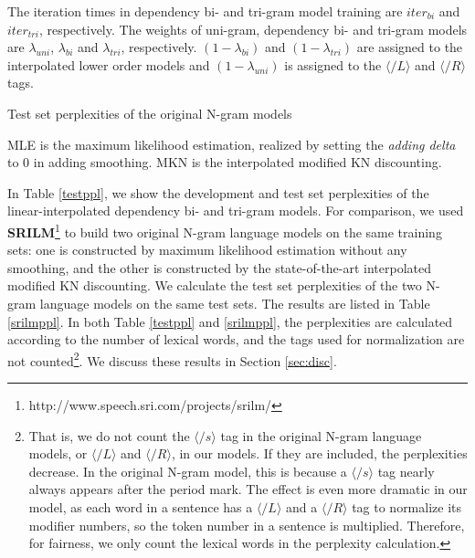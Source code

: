 \documentclass[english]{jnlp_1.4}
\begin{document}
\begin{table}[b]
\label{testppl}

\vspace{4pt}\small
The iteration times in dependency bi- and tri-gram model training are $\mathit{iter}_{\mathit{bi}}$ and $\mathit{iter}_{\mathit{tri}}$, respectively.
The weights of uni-gram, dependency bi- and tri-gram models are $\lambda_{\mathit{uni}}$, $\lambda_{\mathit{bi}}$ and $\lambda_{\mathit{tri}}$, respectively. $(1-\lambda_{\mathit{bi}})$ and $(1-\lambda_{\mathit{tri}})$ are assigned to the interpolated lower order models and $(1-\lambda_{\mathit{uni}})$ is assigned to the $\langle \slash L \rangle$ and $\langle \slash R \rangle$ tags.
\par
\end{table}
\begin{table}[b]
\caption{Test set perplexities of the original N-gram models}
\label{srilmppl}

\vspace{4pt}\small
MLE is the maximum likelihood estimation, realized by setting the {\it{adding delta}} to $0$ in adding smoothing. MKN is the interpolated modified KN discounting.
\par
\end{table}

In Table \ref{testppl}, we show the development and test set perplexities of the linear-interpolated dependency bi- and tri-gram models. For comparison, we used {\bf{SRILM}}\footnote{http://www.speech.sri.com/projects/srilm/} \cite {stolcke2002srilm} to build two original N-gram language models on the same training sets: one is constructed by maximum likelihood estimation without any smoothing, and the other is constructed by the state-of-the-art interpolated modified KN discounting.  We calculate the test set perplexities of the two N-gram language models on the same test sets. The results are listed in Table \ref{srilmppl}. In both Table \ref{testppl} and \ref{srilmppl}, the perplexities are calculated according to the number of lexical words, and the tags used for normalization are not counted\footnote{That is, we do not count the $\langle \slash s \rangle$ tag in the original N-gram language models, or $\langle \slash L \rangle$ and $\langle \slash R \rangle$, in our models. If they are included, the perplexities decrease. In the original N-gram model, this is because a $\langle \slash s \rangle$ tag nearly always appears after the period mark. The effect is even more dramatic in our model,  as each word in a sentence has a $\langle \slash L \rangle$ and a $\langle \slash R \rangle$ tag to normalize its modifier numbers, so the token number in a sentence is multiplied. Therefore, for fairness, we only count the lexical words in the perplexity calculation.}. We discuss these results in Section \ref{sec:disc}.
\end{document}
